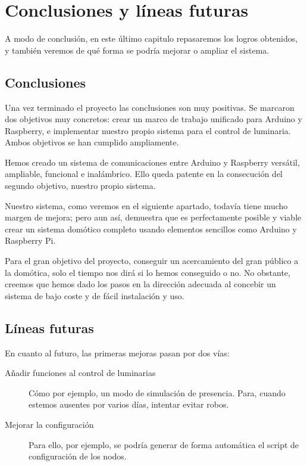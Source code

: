 \chapter{Conclusiones y líneas futuras}


A modo de conclusión, en este último capitulo repasaremos  los logros obtenidos, y también veremos de qué forma se podría mejorar o ampliar el sistema.


\section{Conclusiones}

Una vez terminado el proyecto las conclusiones son muy positivas. Se marcaron dos objetivos muy concretos: crear un marco de trabajo unificado para Arduino y Raspberry, e implementar nuestro propio sistema para el control de luminaria. Ambos objetivos se han cumplido ampliamente.

 Hemos creado un sistema de comunicaciones entre Arduino y Raspberry versátil, ampliable, funcional e inalámbrico. Ello queda patente en la consecución del segundo objetivo, nuestro propio sistema. 

Nuestro sistema, como veremos en el siguiente apartado, todavía tiene mucho margen de mejora; pero aun así,  demuestra que es perfectamente posible y viable crear un sistema domótico completo usando elementos sencillos como Arduino y Raspberry Pi.

Para el gran objetivo del proyecto, conseguir un acercamiento del gran público a la domótica, solo el tiempo nos dirá si lo hemos conseguido o no. No obstante, creemos que hemos dado los pasos en la dirección adecuada al concebir un sistema de bajo coste y de fácil instalación y uso.
\clearpage

\section{Líneas futuras}

En cuanto al futuro, las primeras mejoras pasan por dos vías: 

\begin{description}
   \item[Añadir funciones al control de luminarias] Cómo por ejemplo, un modo de simulación de presencia. Para, cuando estemos ausentes por varios días,  intentar evitar robos.
   \item[Mejorar la configuración] Para ello, por ejemplo, se podría generar de forma automática el script de configuración de los nodos. 
   \end{description} 
   
